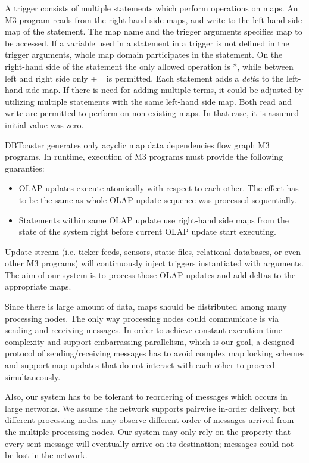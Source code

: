 \documentclass{sig-semester}
\def\OLAP{OLAP\xspace}
\def\M3{M3\xspace}
\begin{document}
A trigger consists of multiple statements which perform operations on maps. An \M3 program reads from the right-hand side maps, and write to the left-hand side map of the statement. The map name and the trigger arguments specifies map to be accessed. If a variable used in a statement in a trigger is not defined in the trigger arguments, whole map domain participates in the statement. On the right-hand side of the statement the only allowed operation is *, while between left and right side only += is permitted. Each statement adds a \textit{delta} to the left-hand side map. If there is need for adding multiple terms, it could be adjusted by utilizing multiple statements with the same left-hand side map. Both read and write are permitted to perform on non-existing maps. In that case, it is assumed initial value was zero.

DBToaster generates only acyclic map data dependencies flow graph \M3 programs. In runtime, execution of \M3 programs must provide the following guaranties:
\begin{itemize}
 \item \OLAP updates execute atomically with respect to each other. The effect has to be the same as whole \OLAP update sequence was processed sequentially.
 \item Statements within same \OLAP update use right-hand side maps from the state of the system right before current \OLAP update start executing.
\end{itemize}

Update stream (i.e. ticker feeds, sensors, static files, relational databases, or even other \M3 programs) will continuously inject triggers instantiated with arguments. The aim of our system is to process those \OLAP updates and add deltas to the appropriate maps.

Since there is large amount of data, maps should be distributed among many processing nodes. The only way processing nodes could communicate is via sending and receiving messages. In order to achieve constant execution time complexity and support embarrassing parallelism, which is our goal, a designed protocol of sending/receiving messages has to avoid complex map locking schemes and support map updates that do not interact with each other to proceed simultaneously.

Also, our system has to be tolerant to reordering of messages which occurs in large networks. We assume the network supports pairwise in-order delivery, but different processing nodes may observe different order of messages arrived from the multiple processing nodes. Our system may only rely on the property that every sent message will eventually arrive on its destination; messages could not be lost in the network.
\end{document}
